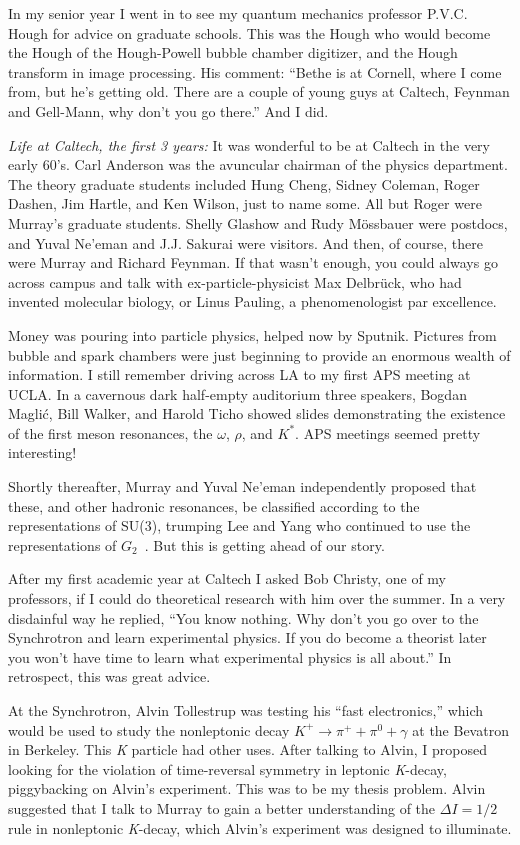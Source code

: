 \documentclass[12pt]{article}
\begin{document}
In my senior year I went in to see my quantum mechanics professor P.V.C. Hough for advice on graduate schools. This was the Hough who would become the Hough of the Hough-Powell bubble chamber digitizer, and the Hough transform in image processing. His comment: ``Bethe is at Cornell, where I come from, but he's getting old. There are a couple of young guys at Caltech, Feynman and Gell-Mann, why don't you go there.'' And I did.

{\it Life at Caltech, the first 3 years: } It was wonderful to be at Caltech in the very early 60's. Carl Anderson was the avuncular chairman of the physics department. The theory graduate students included Hung Cheng, Sidney Coleman, Roger Dashen, Jim Hartle, and Ken Wilson, just to name some. All but Roger were Murray's graduate students. Shelly Glashow and Rudy M\"{o}ssbauer were postdocs, and Yuval Ne'eman and J.J. Sakurai were visitors. And then, of course, there were Murray and Richard Feynman. If that wasn't enough, you could always go across campus and talk with ex-particle-physicist Max Delbr\"{u}ck, who had invented molecular biology, or Linus Pauling, a phenomenologist par excellence.

Money was pouring into particle physics, helped now by Sputnik. Pictures from bubble and spark chambers were just beginning to provide an enormous wealth of information. I still remember driving across LA to my first APS meeting at UCLA. In a cavernous dark half-empty auditorium three speakers, Bogdan Magli\'{c}, Bill Walker, and Harold Ticho showed slides demonstrating the existence of the first meson resonances, the $\omega$, $\rho$, and $K^{*}$.  APS meetings seemed pretty interesting!

Shortly thereafter, Murray and Yuval Ne'eman independently proposed that these, and other hadronic resonances, be classified according to the representations of SU(3),  trumping Lee and Yang who continued to use the representations of $G_2$~\cite{LeeYang}. But this is getting ahead of our story.

After my first academic year at Caltech I asked Bob Christy, one of my professors, if I could do theoretical research with him over the summer. In a very disdainful way he replied, ``You know nothing. Why don't you go over to the Synchrotron and learn experimental physics. If you do become a theorist later you won't have time to learn what experimental physics is all about.'' In retrospect, this was great advice.

At the Synchrotron, Alvin Tollestrup was testing his ``fast electronics,'' which would be used to study the nonleptonic decay $K^{+}\rightarrow \pi^{+}+\pi^{0}+\gamma$ at the Bevatron in Berkeley. This {\it K} particle had other uses.   After talking to Alvin, I proposed looking for the violation of time-reversal symmetry in leptonic {\it K}-decay, piggybacking on Alvin's experiment. This was to be my thesis problem. Alvin suggested that I talk to Murray to gain a better understanding of the $\Delta I = 1/2$ rule in nonleptonic {\it K}-decay, which Alvin's experiment was designed to illuminate.
\end{document}
